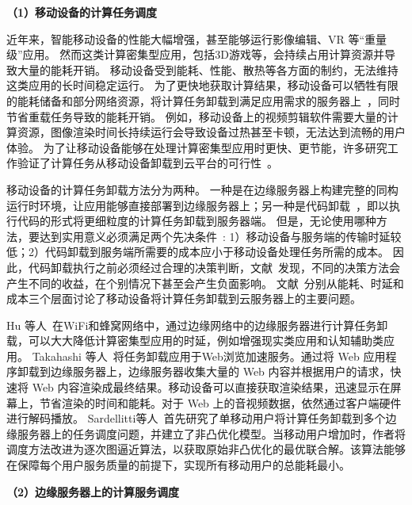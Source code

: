\textbf{（1）移动设备的计算任务调度}

近年来，智能移动设备的性能大幅增强，甚至能够运行影像编辑、VR 等“重量级”应用。
然而这类计算密集型应用，包括3D游戏等，会持续占用计算资源并导致大量的能耗开销。
移动设备受到能耗、性能、散热等各方面的制约，无法维持这类应用的长时间稳定运行。
为了更快地获取计算结果，移动设备可以牺牲有限的能耗储备和部分网络资源，将计算任务卸载到满足应用需求的服务器上~\cite{DBLP:conf/ispa/KovachevYK12}，同时节省重载任务导致的能耗开销。
例如，移动设备上的视频剪辑软件需要大量的计算资源，图像渲染时间长持续运行会导致设备过热甚至卡顿，无法达到流畅的用户体验。
为了让移动设备能够在处理计算密集型应用时更快、更节能，许多研究工作验证了计算任务从移动设备卸载到云平台的可行性~\cite{DBLP:conf/secon/HassanXWC15,DBLP:journals/pervasive/SatyanarayananBCD09,DBLP:journals/computer/KumarL10}。

移动设备的计算任务卸载方法分为两种。
一种是在边缘服务器上构建完整的同构运行时环境，让应用能够直接部署到边缘服务器上；另一种是代码卸载~\cite{DBLP:conf/mobisys/CuervoBCWSCB10}，即以执行代码的形式将更细粒度的计算任务卸载到服务器端。
但是，无论使用哪种方法，要达到实用意义必须满足两个先决条件~\cite{Flores:2017bv}: 1）移动设备与服务端的传输时延较低；2）代码卸载到服务端所需要的成本应小于移动设备处理任务所需的成本。
因此，代码卸载执行之前必须经过合理的决策判断，文献~发现，不同的决策方法会产生不同的收益，在个别情况下甚至会产生负面影响。
文献~分别从能耗、时延和成本三个层面讨论了移动设备将计算任务卸载到云服务器上的主要问题。

Hu 等人~\cite{DBLP:conf/apsys/HuGHWACPS16}在WiFi和蜂窝网络中，通过边缘网络中的边缘服务器进行计算任务卸载，可以大大降低计算密集型应用的时延，例如增强现实类应用和认知辅助类应用。
Takahashi 等人~\cite{DBLP:conf/mobilecloud/TakahashiTK15}将任务卸载应用于Web浏览加速服务。通过将 Web 应用程序卸载到边缘服务器上，边缘服务器收集大量的 Web 内容并根据用户的请求，快速将 Web 内容渲染成最终结果。移动设备可以直接获取渲染结果，迅速显示在屏幕上，节省渲染的时间和能耗。对于 Web 上的音视频数据，依然通过客户端硬件进行解码播放。
Sardellitti等人~\cite{DBLP:journals/tsipn/SardellittiSB15}首先研究了单移动用户将计算任务卸载到多个边缘服务器上的任务调度问题，并建立了非凸优化模型。当移动用户增加时，作者将调度方法改进为逐次图逼近算法，以获取原始非凸优化的最优联合解。该算法能够在保障每个用户服务质量的前提下，实现所有移动用户的总能耗最小。

\textbf{（2）边缘服务器上的计算服务调度}

